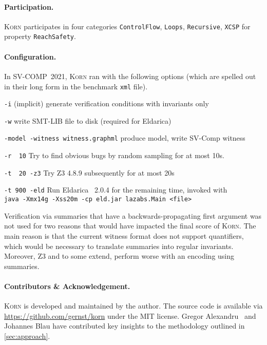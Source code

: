 \documentclass{llncs}
\newcommand{\SVCOMP}[1]{SV-COMP~#1\xspace}
\newcommand{\Korn}{\textsc{Korn}\xspace}
\begin{document}
\paragraph{Participation.} \Korn participates in four categories
\texttt{ControlFlow},
\texttt{Loops},
\texttt{Recursive},
\texttt{XCSP}
for property \texttt{ReachSafety}.

\paragraph{Configuration.} In \SVCOMP{2021}, \Korn ran with the following options
(which are spelled out in their long form in the benchmark \texttt{xml} file).

\smallskip

\texttt{-i} (implicit)
    \tabto{2.8cm} generate verification conditions with invariants only

\texttt{-w}
    \tabto{2.8cm} write SMT-LIB file to disk (required for Eldarica)

\smallskip

\texttt{-model -witness witness.graphml}
    produce model, write SV-Comp witness

\smallskip

\texttt{-r~~10}
    \tabto{2.8cm} Try to find obvious bugs by random sampling for at most 10s.

\texttt{-t~~20 -z3}
    \tabto{2.8cm} Try Z3 4.8.9 subsequently for at most 20s

\texttt{-t~900 -eld}
    \tabto{2.8cm} Run Eldarica~\cite{hojjat2018eldarica} 2.0.4 for the remaining time, invoked with \\
    \tabto{2.8cm} \texttt{java -Xmx14g -Xss20m -cp eld.jar lazabs.Main <file>}

\smallskip

\noindent    
Verification via summaries that have a backwards-propagating first argument was not used
for two reasons that would have impacted the final score of \Korn.
The main reason is that the current witness format does not support quantifiers,
which would be necessary to translate summaries into regular invariants.
Moreover, Z3 and to some extend, perform worse with an encoding using summaries.

\paragraph{Contributors \& Acknowledgement.}

\Korn is developed and maintained by the author.
The source code is available via \url{https://github.com/gernst/korn} under the MIT license.
Gregor Alexandru~\cite{alexandru2019} and Johannes Blau have contributed
key insights to the methodology outlined in \cref{sec:approach}.



\end{document}
